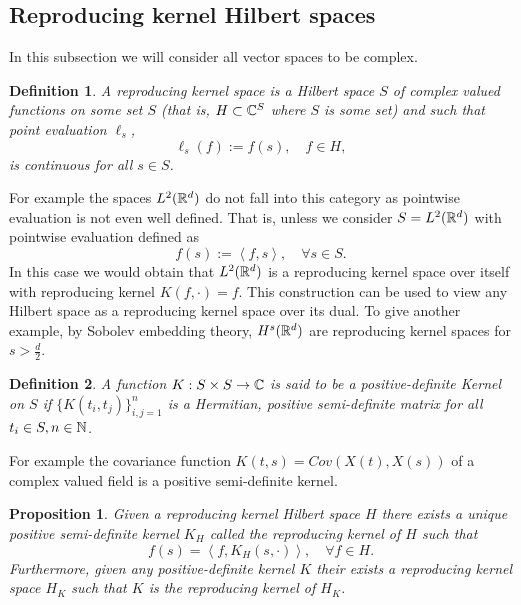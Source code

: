 \documentclass[12pt]{article}
\newtheorem{proposition}{Proposition}
\newtheorem{definition}{Definition}
\newcommand{\br}[1]{\left\langle#1\right\rangle}
\begin{document}
\subsection{Reproducing kernel Hilbert spaces}
In this subsection we will consider all vector spaces to be complex.
\begin{definition}
	A reproducing kernel space is a Hilbert space $S$ of complex valued functions on some set $S$ (that is, $H\subset \mathbb{C}^S$ where $S$ is some set) and such that  point evaluation $\ell _s$, $$\ell _s(f):=f(s),\quad f\in H,$$ is continuous for all $s\in S$.
\end{definition}
For example the spaces $L^2({\mathbb R}^d)$ do not fall into this category as pointwise evaluation is not even well defined. That is, unless we consider $S=L^2({\mathbb R}^d)$ with pointwise evaluation defined as
\begin{equation*}
	f(s):=\br{f,s},\quad\forall s\in S.
\end{equation*}
In this case we would obtain that $L^2({\mathbb R}^d)$ is a reproducing kernel space over itself with reproducing kernel $K(f,\cdot )=f.$ This construction can be used to view any Hilbert space as a reproducing kernel space over its dual. To give another example, by Sobolev embedding theory, $H^s({\mathbb R}^d)$ are reproducing kernel spaces for $s>\frac{d}{2}$.
\begin{definition}
	A function $K:S\times S\to \mathbb{C}$ is said to be a \emph{positive-definite  Kernel} on $S$ if  $\{K(t_i,t_j)\}_{i,j=1}^n$ is a Hermitian, positive semi-definite matrix for all $t_i \in S,n \in \mathbb{N}$.
\end{definition}
For example the covariance function $K(t,s)=Cov(X(t),X(s))$ of a complex valued field is a positive semi-definite kernel.
\begin{proposition}\label{existence reproducing kernel}
	Given a reproducing kernel Hilbert space $H$ there exists a unique positive semi-definite kernel $K_H$ called the \emph{reproducing kernel} of $H$ such that
	\begin{equation*}
		f(s)=\br{f,K_H(s,\cdot )},\quad\forall f\in H.
	\end{equation*}
	Furthermore, given any positive-definite kernel $K$ their exists a reproducing kernel space $H_K$ such that $K$ is the reproducing kernel of $H_K$.
\end{proposition}
\end{document}

